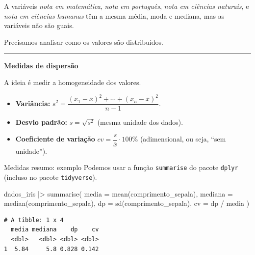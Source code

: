 \documentclass[
  10pt,
  ignorenonframetext,
]{beamer}
\newenvironment{Shaded}{\begin{snugshade}}{\end{snugshade}}
\newcommand{\AttributeTok}[1]{\textcolor[rgb]{0.40,0.45,0.13}{#1}}
\newcommand{\FunctionTok}[1]{\textcolor[rgb]{0.28,0.35,0.67}{#1}}
\newcommand{\NormalTok}[1]{\textcolor[rgb]{0.00,0.23,0.31}{#1}}
\newcommand{\SpecialCharTok}[1]{\textcolor[rgb]{0.37,0.37,0.37}{#1}}
\providecommand{\tightlist}{%
  \setlength{\itemsep}{0pt}\setlength{\parskip}{0pt}}\usepackage{longtable,booktabs,array}
\newcommand*{\regrafina}{\rule{\textwidth}{0.5pt}}
\begin{document}
\begin{frame}
A variáveis \emph{nota em matemática}, \emph{nota em português},
\emph{nota em ciências naturais}, e \emph{nota em ciências humanas} têm
a mesma média, moda e mediana, mas as variáveis não são guais.

Precisamos analisar como os valores são distribuídos.

\regrafina

\textbf{Medidas de dispersão}

A ideia é medir a homogeneidade dos valores.

\begin{itemize}
\tightlist
\item
  \textbf{Variância: }
  \(s^2 = \dfrac{(x_1 - \overline{x})^2 + \cdots + (x_n - \overline{x})^2}{n-1}\).
\item
  \textbf{Desvio padrão: } \(s = \sqrt{s^2}\) (mesma unidade dos dados).
\item
  \textbf{Coeficiente de variação}
  \(cv= \dfrac{s}{\overline{x}} \cdot 100\%\) (adimensional, ou seja,
  ``sem unidade'').
\end{itemize}

\normalsize
\end{frame}

\begin{frame}[fragile]{Medidas resumo: exemplo}
\protect\hypertarget{medidas-resumo-exemplo}{}
Podemos usar a função \texttt{summarise} do pacote \texttt{dplyr}
(incluso no pacote \texttt{tidyverse}).

\begin{Shaded}
\begin{Highlighting}[]
\NormalTok{dados\_iris }\SpecialCharTok{|\textgreater{}}
  \FunctionTok{summarise}\NormalTok{(}
    \AttributeTok{media =} \FunctionTok{mean}\NormalTok{(comprimento\_sepala),}
    \AttributeTok{mediana =} \FunctionTok{median}\NormalTok{(comprimento\_sepala),}
    \AttributeTok{dp =} \FunctionTok{sd}\NormalTok{(comprimento\_sepala),}
    \AttributeTok{cv =}\NormalTok{ dp }\SpecialCharTok{/}\NormalTok{ media}
\NormalTok{  )}
\end{Highlighting}
\end{Shaded}

\begin{verbatim}
# A tibble: 1 x 4
  media mediana    dp    cv
  <dbl>   <dbl> <dbl> <dbl>
1  5.84     5.8 0.828 0.142
\end{verbatim}
\end{frame}
\end{document}
